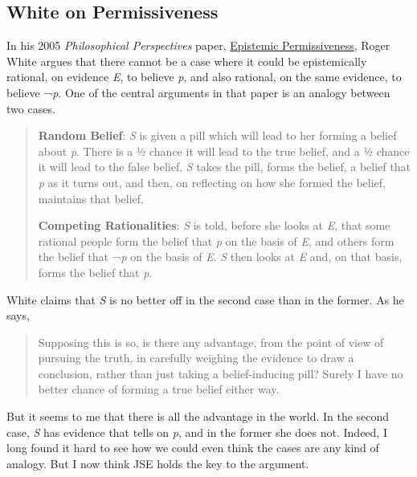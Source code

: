 \documentclass[
  11pt,
  letterpaper,
  DIV=11,
  numbers=noendperiod,
  twoside]{scrartcl}
\begin{document}
\subsection{White on Permissiveness}\label{white-on-permissiveness}

In his 2005 \emph{Philosophical Perspectives} paper,
\href{https://web.archive.org/web/20110709133356/http://philosophy.fas.nyu.edu/docs/IO/1180/EP.pdf}{Epistemic
Permissiveness}, Roger White argues that there cannot be a case where it
could be epistemically rational, on evidence \emph{E}, to believe
\emph{p}, and also rational, on the same evidence, to believe ¬\emph{p}.
One of the central arguments in that paper is an analogy between two
cases.

\begin{quote}
\textbf{Random Belief}: \emph{S} is given a pill which will lead to her
forming a belief about \emph{p}. There is a ½ chance it will lead to the
true belief, and a ½ chance it will lead to the false belief. \emph{S}
takes the pill, forms the belief, a belief that \emph{p} as it turns
out, and then, on reflecting on how she formed the belief, maintains
that belief.

\textbf{Competing Rationalities}: \emph{S} is told, before she looks at
\emph{E}, that some rational people form the belief that \emph{p} on the
basis of \emph{E}, and others form the belief that ¬\emph{p} on the
basis of \emph{E}. \emph{S} then looks at \emph{E} and, on that basis,
forms the belief that \emph{p}.
\end{quote}

White claims that \emph{S} is no better off in the second case than in
the former. As he says,

\begin{quote}
Supposing this is so, is there any advantage, from the point of view of
pursuing the truth, in carefully weighing the evidence to draw a
conclusion, rather than just taking a belief-inducing pill? Surely I
have no better chance of forming a true belief either way.
\end{quote}

But it seems to me that there is all the advantage in the world. In the
second case, \emph{S} has evidence that tells on \emph{p}, and in the
former she does not. Indeed, I long found it hard to see how we could
even think the cases are any kind of analogy. But I now think JSE holds
the key to the argument.
\end{document}
